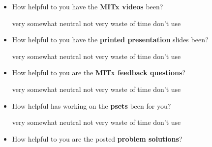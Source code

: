 \documentclass[handout]{mcs}
\begin{document}
\begin{itemize}
\begin{itemize}
\item How helpful to you have the \textbf{MITx videos} been?

\begin{center}
very\hspace{0.3in} somewhat \hspace{0.3in} neutral\hspace{0.3in} not
very \hspace{0.3in} waste of time  \hspace{0.7in}don't use
\end{center}

\item How helpful to you have the \textbf{printed presentation} slides been?

\begin{center}
very\hspace{0.3in} somewhat \hspace{0.3in} neutral\hspace{0.3in} not
very \hspace{0.3in} waste of time  \hspace{0.7in}don't use
\end{center}

\item How helpful to you are the \textbf{MITx feedback questions}?

\begin{center}
very\hspace{0.3in} somewhat \hspace{0.3in} neutral\hspace{0.3in} not
very \hspace{0.3in} waste of time  \hspace{0.7in}don't use
\end{center}

\item How helpful has working on the \textbf{psets} been for you?
 
\begin{center}
very\hspace{0.3in} somewhat \hspace{0.3in} neutral\hspace{0.3in} not
very \hspace{0.3in} waste of time  \hspace{0.7in}don't use
\end{center}


\item How helpful to you are the posted \textbf{problem solutions}?
 

\end{itemize}
\end{itemize}
\end{document}

